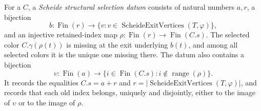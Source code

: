 \begin{definition}
For a  $C$, a \emph{Scheide structural
selection datum} consists of natural numbers $a,r$, a bijection
\[
 b:\operatorname{Fin}(r)\longrightarrow
   \{v:v\in\operatorname{ScheideExitVertices}(T,\varphi)\},
\]
and an injective retained-index map
$\rho:\operatorname{Fin}(r)\to\operatorname{Fin}(C.s)$.  The selected
color $C.\gamma(\rho(t))$ is missing at the exit underlying $b(t)$, and
among all selected colors it is the unique one missing there.  The datum
also contains a bijection
\[
 \upsilon:\operatorname{Fin}(a)\longrightarrow
 \{i\in\operatorname{Fin}(C.s):i\notin\operatorname{range}(\rho)\}.
\]
It records the equalities
$C.s=a+r$ and
$r=|\operatorname{ScheideExitVertices}(T,\varphi)|$, and records that each
old index belongs, uniquely and disjointly, either to the image of
$\upsilon$ or to the image of $\rho$.
\end{definition}
